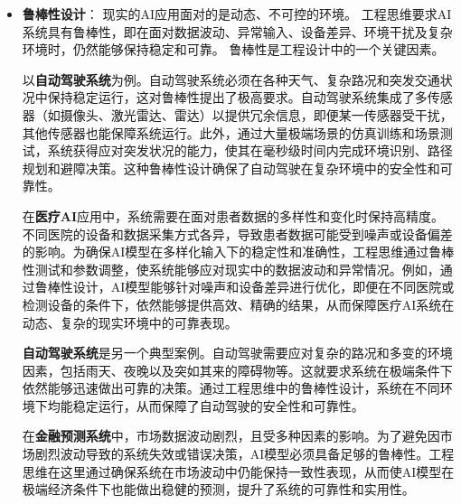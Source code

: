 \begin{itemize}
在{\bf 推荐系统}中，处理数百万用户和上亿个商品的海量数据是系统的常态。推荐系统需要在最短时间内生成个性化推荐结果，这不仅依赖于优化算法的设计，还需要使用分布式计算技术来支持大规模并行处理，将复杂任务拆解成小块，以应对海量数据处理。这不仅提升了系统的实时响应能力，还使得模型能够适应用户需求的动态变化。

在{\bf 图像分类}和{\bf 自然语言处理}任务中，处理大型图像数据集（如ImageNet）或长文本数据也面临相似的需求，单一计算节点的资源通常不足以应对这些任务。因此工程上通常采用分布式训练，将模型任务分配到多节点、多服务器环境下并行处理，以大幅提升系统的整体计算能力和响应效率。这种方法为图像处理、文本处理等大规模应用提供了计算基础，使得系统能够高效应对海量数据。

\item {\bf 鲁棒性设计}：
现实的AI应用面对的是动态、不可控的环境。
工程思维要求AI系统具有鲁棒性，即在面对数据波动、异常输入、设备差异、环境干扰及复杂环境时，仍然能够保持稳定和可靠。
鲁棒性是工程设计中的一个关键因素。

以{\bf 自动驾驶系统}为例。自动驾驶系统必须在各种天气、复杂路况和突发交通状况中保持稳定运行，这对鲁棒性提出了极高要求。自动驾驶系统集成了多传感器（如摄像头、激光雷达、雷达）以提供冗余信息，即便某一传感器受干扰，其他传感器也能保障系统运行。此外，通过大量极端场景的仿真训练和场景测试，系统获得应对突发状况的能力，使其在毫秒级时间内完成环境识别、路径规划和避障决策。这种鲁棒性设计确保了自动驾驶在复杂环境中的安全性和可靠性。

在{\bf 医疗AI}应用中，系统需要在面对患者数据的多样性和变化时保持高精度。不同医院的设备和数据采集方式各异，导致患者数据可能受到噪声或设备偏差的影响。为确保AI模型在多样化输入下的稳定性和准确性，工程思维通过鲁棒性测试和参数调整，使系统能够应对现实中的数据波动和异常情况。例如，通过鲁棒性设计，AI模型能够针对噪声和设备差异进行优化，即便在不同医院或检测设备的条件下，依然能够提供高效、精确的结果，从而保障医疗AI系统在动态、复杂的现实环境中的可靠表现。

{\bf 自动驾驶系统}是另一个典型案例。自动驾驶需要应对复杂的路况和多变的环境因素，包括雨天、夜晚以及突如其来的障碍物等。这就要求系统在极端条件下依然能够迅速做出可靠的决策。通过工程思维中的鲁棒性设计，系统在不同环境下均能稳定运行，从而保障了自动驾驶的安全性和可靠性。

在{\bf 金融预测系统}中，市场数据波动剧烈，且受多种因素的影响。为了避免因市场剧烈波动导致的系统失效或错误决策，AI模型必须具备足够的鲁棒性。工程思维在这里通过确保系统在市场波动中仍能保持一致性表现，从而使AI模型在极端经济条件下也能做出稳健的预测，提升了系统的可靠性和实用性。


\end{itemize}
